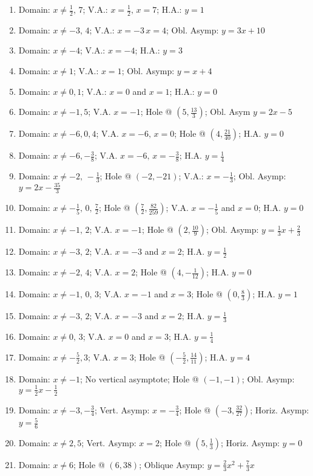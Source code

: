 \begin{enumerate}
    \item Domain: $x \neq \frac{1}{2}, \, 7$; V.A.: $x=\frac{1}{2}, \, x=7$; H.A.: $y=1$
    \item Domain: $x \neq -3, \, 4$; V.A.: $x=-3 \, x = 4$; Obl. Asymp: $y = 3x+10$
    \item Domain: $x \neq -4$; V.A.: $x = -4$; H.A.: $y = 3$
    \item Domain: $x \neq 1$; V.A.: $x = 1$; Obl. Asymp: $y = x + 4$
    \item Domain: $x \neq 0, 1$; V.A.: $x = 0$ and $x = 1$; H.A.: $y = 0$ 
    \item Domain: $x \neq -1, 5$; V.A. $x=-1$; Hole @ $\left(5, \frac{13}{3}\right)$; Obl. Asym $y = 2x-5$
    \item Domain: $x \neq -6, 0, 4$; V.A. $x = -6, \, x = 0$; Hole @ $\left(4, \frac{21}{40}\right)$; H.A. $y = 0$
    \item Domain: $x \neq -6, -\frac{3}{8}$; V.A. $x = -6, \, x = -\frac{3}{8}$; H.A. $y = \frac{1}{4}$
    \item Domain: $x \neq -2, \, -\frac{1}{3}$; Hole @ $(-2,-21)$; V.A.: $x = -\frac{1}{3}$; Obl. Asymp: $y = 2x-\frac{35}{3}$
    \item Domain: $x \neq -\frac{1}{5}, \, 0, \, \frac{7}{2}$; Hole @ $\left(\frac{7}{2}, \frac{82}{259}\right)$; V.A. $x = -\frac{1}{5}$ and $x=0$; H.A. $y=0$
    \item Domain: $x \neq -1, \, 2$; V.A. $x = -1$; Hole @ $\left(2, \frac{10}{9}\right)$; Obl. Asymp: $y = \frac{1}{3}x+\frac{2}{3}$
    \item Domain: $x \neq -3, \, 2$; V.A. $x = -3$ and $x = 2$; H.A. $y = \frac{1}{2}$
    \item Domain: $x \neq -2, \, 4$; V.A. $x = 2$; Hole @ $\left(4, -\frac{1}{12}\right)$; H.A. $y = 0$
    \item Domain: $x \neq -1, \, 0, \, 3$; V.A. $x = -1$ and $x = 3$; Hole @ $\left(0, \frac{8}{3}\right)$; H.A. $y = 1$
    \item Domain: $x \neq -3, \, 2$; V.A. $x = -3$ and $x = 2$; H.A. $y = \frac{1}{3}$
    \item Domain: $x \neq 0, \, 3$; V.A. $x = 0$ and $x = 3$; H.A. $y = \frac{1}{4}$
    \item Domain: $x \neq -\frac{5}{2}, 3$; V.A. $x = 3$; Hole @ $\left(-\frac{5}{2}, \frac{14}{11}\right)$; H.A. $y = 4$
    \item Domain: $x \neq -1$; No vertical asymptote; Hole @ $(-1,-1)$; Obl. Asymp: $y = \frac{1}{2}x-\frac{1}{2}$
    \item Domain: $x \neq -3, -\frac{3}{4}$; Vert. Asymp: $x = -\frac{3}{4}$; Hole @ $\left(-3, \frac{32}{27}\right)$; Horiz. Asymp: $y = \frac{5}{6}$
    \item Domain: $x \neq 2, 5$; Vert. Asymp: $x = 2$; Hole @ $\left(5, \frac{1}{3}\right)$; Horiz. Asymp: $y = 0$
    \item Domain: $x \neq 6$; Hole @ $\left(6, 38\right)$; Oblique Asymp: $y = \frac{2}{3}x^2 +\frac{7}{3}x$
    

\end{enumerate}
